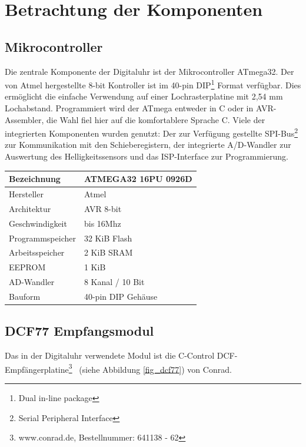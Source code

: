 \section{Betrachtung der Komponenten}
\subsection{Mikrocontroller}
Die zentrale Komponente der Digitaluhr ist der Mikrocontroller ATmega32. Der von Atmel hergestellte 8-bit Kontroller ist im 40-pin DIP\footnote{Dual in-line package} Format verfügbar. Dies ermöglicht die einfache Verwendung auf einer Lochrasterplatine mit 2,54 mm Lochabstand. Programmiert wird der ATmega entweder in C oder in AVR-Assembler, die Wahl fiel hier auf die komfortablere Sprache C.
Viele der integrierten Komponenten wurden genutzt: Der zur Verfügung gestellte SPI-Bus\footnote{Serial Peripheral Interface} zur Kommunikation mit den Schieberegistern, der integrierte A/D-Wandler zur Auswertung des Helligkeitssensors und das ISP-Interface zur Programmierung.

\begin{center}
 \renewcommand{\arraystretch}{1.2}
 \begin{tabular}{||l | l||}
  \hline\hline
  Bezeichnung&ATMEGA32 16PU 0926D\\\hline
  Hersteller&Atmel\\\hline
  Architektur&AVR 8-bit \\\hline
  Geschwindigkeit&bis 16Mhz \\\hline
  Programmspeicher&32 KiB Flash \\\hline
  Arbeitsspeicher&2 KiB SRAM \\\hline
  EEPROM&1 KiB \\\hline
  AD-Wandler&8 Kanal / 10 Bit \\\hline
  Bauform&40-pin DIP Gehäuse \\
  \hline\hline    
\end{tabular}
\end{center}


\subsection{DCF77 Empfangsmodul}\label{sec_dcf77modul}
Das in der Digitaluhr verwendete Modul ist die \glqq C-Control DCF-Empfängerplatine\grqq\footnote{www.conrad.de, Bestellnummer: 641138 - 62}~ (siehe Abbildung \ref{fig_dcf77}) von Conrad.


